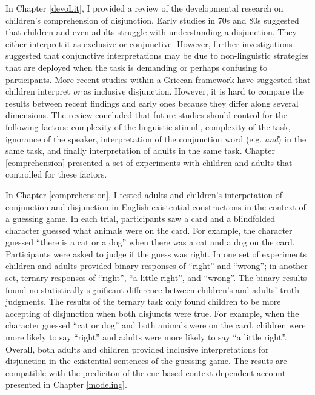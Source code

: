 \documentclass[oneside]{report}
\theoremstyle{definition}
\theoremstyle{definition}
\theoremstyle{definition}
\theoremstyle{remark}
\begin{document}
In Chapter \ref{devoLit}, I provided a review of the developmental
research on children's comprehension of disjunction. Early studies in
70s and 80s suggested that children and even adults struggle with
understanding a disjunction. They either interpret it as exclusive or
conjunctive. However, further investigations suggested that conjunctive
interpretations may be due to non-linguistic strategies that are
deployed when the task is demanding or perhaps confusing to
participants. More recent studies within a Gricean framework have
suggested that children interpret \emph{or} as inclusive disjunction.
However, it is hard to compare the results between recent findings and
early ones because they differ along several dimensions. The review
concluded that future studies should control for the following factors:
complexity of the linguistic stimuli, complexity of the task, ignorance
of the speaker, interpretation of the conjunction word (e.g. \emph{and})
in the same task, and finally interpretation of adults in the same task.
Chapter \ref{comprehension} presented a set of experiments with children
and adults that controlled for these factors.

In Chapter \ref{comprehension}, I tested adults and children's
interpetation of conjunction and disjunction in English existential
constructions in the context of a guessing game. In each trial,
participants saw a card and a blindfolded character guessed what animals
were on the card. For example, the character guessed ``there is a cat or
a dog'' when there was a cat and a dog on the card. Participants were
asked to judge if the guess was right. In one set of experiments
children and adults provided binary responses of ``right'' and
``wrong''; in another set, ternary responses of ``right'', ``a little
right'', and ``wrong''. The binary results found no statistically
significant difference between children's and adults' truth judgments.
The results of the ternary task only found children to be more accepting
of disjunction when both disjuncts were true. For example, when the
character guessed ``cat or dog'' and both animals were on the card,
children were more likely to say ``right'' and adults were more likely
to say ``a little right''. Overall, both adults and children provided
inclusive interpretations for disjunction in the existential sentences
of the guessing game. The resuts are compatible with the prediciton of
the cue-based context-dependent account presented in Chapter
\ref{modeling}.
\end{document}
